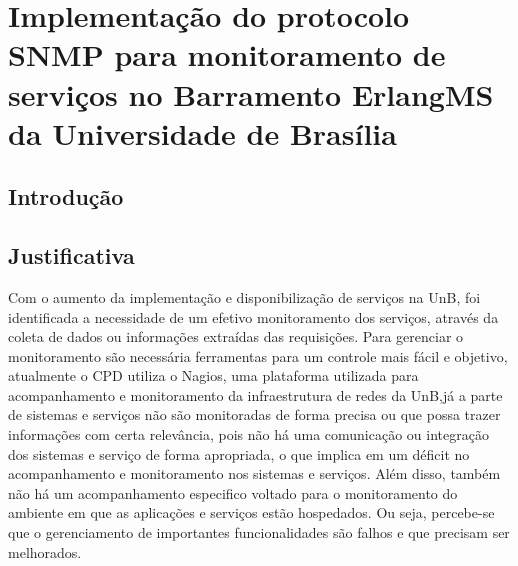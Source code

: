 \documentclass[qualidr]{eesc}
\begin{document}





\sumario

\mainmatter

\chapter[Implementação do protocolo SNMP para monitoramento de serviços no Barramento ErlangMS da Universidade de Brasília]{Implementação do protocolo SNMP para monitoramento de serviços no Barramento ErlangMS da Universidade de Brasília}

\section[Introdução]{Introdução}



\section{Justificativa}

Com o aumento da implementação e disponibilização de serviços na UnB, foi identificada a necessidade de um efetivo monitoramento dos serviços, através da coleta de dados ou informações extraídas das requisições. Para gerenciar o monitoramento são necessária ferramentas para um controle mais fácil e objetivo, atualmente o CPD utiliza o Nagios, uma plataforma utilizada para acompanhamento e monitoramento da infraestrutura de redes da UnB,já a parte de sistemas e serviços não são monitoradas de forma precisa ou que possa trazer informações com certa relevância, pois não há uma comunicação ou integração dos sistemas e serviço de forma apropriada, o que implica em um déficit no acompanhamento e monitoramento nos sistemas e serviços. Além disso, também não há um acompanhamento especifico voltado para o monitoramento do ambiente em que as aplicações e serviços estão hospedados. Ou seja, percebe-se que o gerenciamento de importantes funcionalidades são falhos e que precisam ser melhorados.
\end{document}
